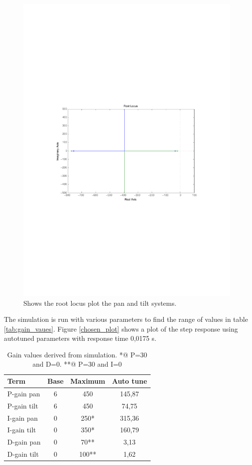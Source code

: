 \begin{figure}[htb]
	\centering
	\includegraphics[width=\textwidth,trim=0 270 0 270]{graphics/rlocus_plot.pdf} %
	\caption{Shows the root locus plot the pan and tilt systems.}
	\label{fig:rlocus_plot}			
\end{figure}

The simulation is run with various parameters to find the range of values in table \ref{tab:gain_vaues}. Figure \ref{chosen_plot} shows a plot of the step response using autotuned parameters with response time 0,0175 s.

\begin{table}[htb]				
	\begin{center}
	\begin{tabular}{l|c|c|c}			
	Term & Base & Maximum & Auto tune \\			
	\hline												
P-gain pan& 6 & 450 & 145,87\\
P-gain tilt& 6 & 450 & 74,75 \\
I-gain pan& 0 & 250* & 315,36  \\
I-gain tilt& 0 & 350* & 160,79 \\
D-gain pan& 0 & 70** & 3,13 \\
D-gain tilt& 0 & 100** & 1,62\\
	\end{tabular}
	\end{center}
	\caption{Gain values derived from simulation. *@ P=30 and D=0. **@ P=30 and I=0}				
	\label{tab:gain_values}			
\end{table}

